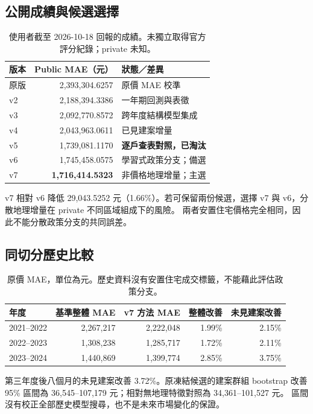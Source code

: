 \documentclass[11pt,a4paper]{article}
\begin{document}
\subsection{公開成績與候選選擇}
\begin{table}[H]\centering
\begin{tabular}{lrl}
\toprule
版本 & Public MAE（元） & 狀態／差異\\
\midrule
原版 & 2,393,304.6257 & 原價 MAE 校準\\
v2 & 2,188,394.3386 & 一年期回測與表徵\\
v3 & 2,092,770.8572 & 跨年度結構模型集成\\
v4 & 2,043,963.0611 & 已見建案增量\\
v5 & 1,739,081.1170 & \textbf{逐戶查表對照，已淘汰}\\
v6 & 1,745,458.0575 & 學習式政策分支；備選\\
v7 & \textbf{1,716,414.5323} & 非價格地理增量；主選\\
\bottomrule
\end{tabular}
\caption{使用者截至 2026-10-18 回報的成績。未獨立取得官方評分紀錄；private 未知。}
\end{table}
v7 相對 v6 降低 29,043.5252 元（1.66\%）。若可保留兩份候選，選擇 v7 與 v6，分散地理增量在 private 不同區域組成下的風險。
兩者安置住宅價格完全相同，因此不能分散政策分支的共同誤差。

\subsection{同切分歷史比較}
\begin{table}[H]\centering
\begin{tabular}{lrrrr}
\toprule
年度 & 基準整體 MAE & v7 方法 MAE & 整體改善 & 未見建案改善\\
\midrule
2021--2022 & 2,267,217 & 2,222,048 & 1.99\% & 2.15\%\\
2022--2023 & 1,308,238 & 1,285,717 & 1.72\% & 2.11\%\\
2023--2024 & 1,440,869 & 1,399,774 & 2.85\% & 3.75\%\\
\bottomrule
\end{tabular}
\caption{原價 MAE，單位為元。歷史資料沒有安置住宅成交標籤，不能藉此評估政策分支。}
\end{table}
第三年度後八個月的未見建案改善 3.72\%。原凍結候選的建案群組 bootstrap 改善 95\% 區間為 36,545--107,179 元；相對無地理特徵對照為 34,361--101,527 元。
區間沒有校正全部歷史模型搜尋，也不是未來市場變化的保證。
\end{document}
